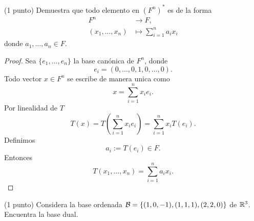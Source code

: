 \documentclass[12pt,a4paper]{article}
\begin{document}
    \begin{mdframed}[style=mdpinkbox,frametitle={Ejercicio 6}]
        (1 punto) Demuestra que todo elemento en $(F^{n})^{*}$ es de la forma
        \begin{align*}
            F^{n}&\to F,\\
            (x_{1},\dots,x_{n})&\mapsto\sum_{i=1}^{n}a_{i}x_{i}
        \end{align*}
        donde $a_{1},\dots,a_{n}\in F$.
    \end{mdframed}

    \begin{proof}
        Sea $\{e_{1},\dots,e_{n}\}$ la base canónica de $F^{n}$, donde
        \begin{equation*}
            e_{i}=(0,\dots,0,1,0,\dots,0).
        \end{equation*}
        Todo vector $x\in F^{n}$ se escribe de manera unica como
        \begin{equation*}
            x=\sum_{i=1}^{n}x_{i}e_{i}.
        \end{equation*}
        Por linealidad de $T$
        \begin{equation*}
            T(x)=T\left(\sum_{i=1}^{n}x_{i}e_{i}\right)=\sum_{i=1}^{n}x_{i}T(e_{i}).
        \end{equation*}
        Definimos
        \begin{equation*}
            a_{i}:=T(e_{i})\in F.
        \end{equation*}
        Entonces
        \begin{equation*}
            T(x_{1},\dots,x_{n})=\sum_{i=1}^{n}a_{i}x_{i}.
        \end{equation*}
    \end{proof}

    \begin{mdframed}[style=mdpinkbox,frametitle={Ejercicio 7}]
        (1 punto) Considera la base ordenada $\mathcal{B}=\{(1,0,-1),(1,1,1),(2,2,0)\}$ de $\mathbb{R}^{3}$.
        Encuentra la base dual.
    \end{mdframed}
\end{document}
